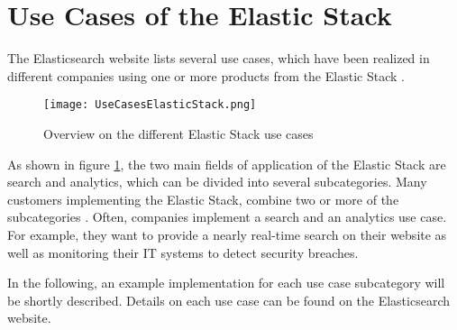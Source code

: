 \section{Use Cases of the Elastic Stack}
The Elasticsearch website lists several use cases, which have been realized in different companies using one or more products from the Elastic Stack \autocite{elastic2019_02}. 

\begin{figure}
    \centering
    \texttt{[image: UseCasesElasticStack.png]}
    \caption{Overview on the different Elastic Stack use cases}
    \label{fig:estackusecases}
\end{figure}

As shown in figure \ref{fig:estackusecases}, the two main fields of application of the Elastic Stack are search and analytics, which can be divided into several subcategories. Many customers implementing the Elastic Stack, combine two or more of the subcategories \autocite{elastic2019_02}. Often, companies implement a search and an analytics use case. For example, they want to provide a nearly real-time search on their website as well as monitoring their IT systems to detect security breaches. 

In the following, an example implementation for each use case subcategory will be shortly described. Details on each use case can be found on the Elasticsearch website.

